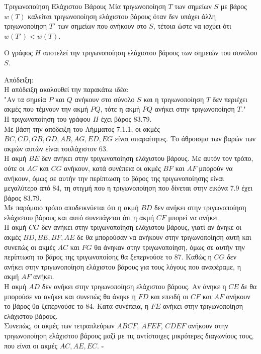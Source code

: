 \documentclass[oneside,12pt]{book}
\theoremstyle{definition}
\begin{document}
\begin{mydefinition}{Τριγωνοποίηση Ελάχιστου Βάρους}{}
	Μία τριγωνοποίηση \(T\) των σημείων \(S\) με βάρος \(w(T)\) καλείται τριγωνοποίηση ελάχιστου βάρους όταν δεν υπάχει άλλη τριγωνοποίηση \(Τ'\) των σημείων που ανήκουν στο \(S\), τέτοια ώστε να ισχύει ότι \(w(T') < w(T)\).
\end{mydefinition}

\begin{mylemma}{}{}
	Ο γράφος \(H\) αποτελεί την τριγωνοποίηση ελάχιστου βάρους των σημειών του συνόλου \(S\).
\end{mylemma}
Απόδειξη: \\
Η απόδειξη ακολουθεί την παρακάτω ιδέα: \\
"Αν τα σημεία \(P\) και \(Q\) ανήκουν στο σύνολο \(S\) και η τριγωνοποίηση \(Τ\) δεν περιέχει ακμές που τέμνουν την ακμή \(PQ\), τότε η ακμή \(PQ\) ανήκει στην τριγωνοποίηση \(Τ\)." \\
Η τριγωνοποίηση του γράφου \(Η\) έχει βάρος 83.79. \\
Με βάση την απόδειξη του Λήμματος 7.1.1, οι ακμές \(BC, CD, GB, GD, AB, AG, ED, EG\) είναι απαραίτητες. Το άθροισμα των βαρών των ακμών αυτών είναι τουλάχιστον 63. \\
Η ακμή \(ΒΕ\) δεν ανήκει στην τριγωνοποίηση ελάχιστου βάρους. Με αυτόν τον τρόπο, ούτε οι \(AC\) και \(CG\) ανήκουν, κατά συνέπεια οι ακμές \(BF\) και \(AF\) μπορούν να ανήκουν, όμως σε αυτήν την περίπτωση το βάρος της τριγωνοποίησης είναι μεγαλύτερο από 84, τη στιγμή που η τριγωνοποίηση που δίνεται στην εικόνα 7.9 έχει βάρος 83.79. \\
Με παρόμοιο τρόπο αποδεικνύεται ότι η ακμή \(BD\) δεν ανήκει στην τριγωνοποίηση ελάχιστου βάρους και αυτό συνεπάγεται ότι η ακμή \(CF\) μπορεί να ανήκει. \\
Η ακμή \(CG\) δεν ανήκει στην τριγωνοποίηση ελάχιστου βάρους, γιατί αν άνηκε οι ακμές \(BD, BE, BF, AE\) δε θα μπορούσαν να ανήκουν στην τριγωνοποίηση αυτή και συνεπώς οι ακμές \(AC\) και \(FG\) θα άνηκαν στην τριγωνοποίηση, όμως σε αυτήν την περίπτωση το βάρος της τριγωνοποίσης θα ξεπερνούσε το 87. Καθώς η \(CG\) δεν ανήκει στην τριγωνοποίηση ελάχιστου βάρους για τους λόγους που αναφέραμε, η ακμή \(AF\) ανήκει. \\
Η ακμή \(AD\) δεν ανήκει στην τριγωνοποίηση ελάχιστου βάρους. Αν άνηκε η \(CE\) δε θα μπορούσε να ανήκει και συνεπώς θα άνηκε η \(FD\) και επειδή οι \(CF\) και \(AF\) ανήκουν το βάρος θα ξεπερνούσε το 84. Κατα συνέπεια, η \(FE\) ανήκει στην τριγωνοποίηση ελάχιστου βάρους. \\
Συνεπώς, οι ακμές των τετραπλεύρων \(ABCF\), \(AFEF\), \(CDEF\) ανήκουν στην τριγωνοποίηση ελάχιστου βάρους μαζί με τις αντίστοιχες μικρότερες διαγωνίους τους, που είναι οι ακμές \(AC, AE, EC\). \(\square\) \\
\end{document}
